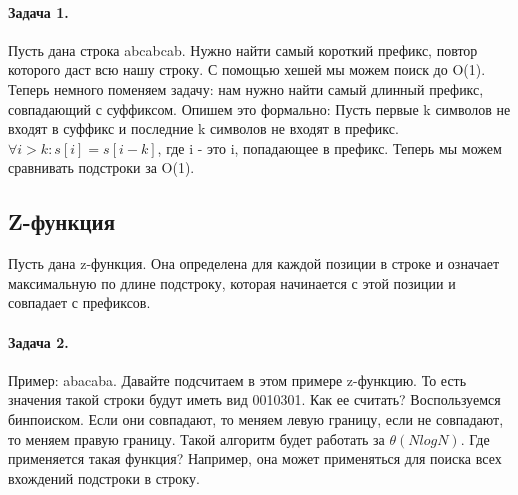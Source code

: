\documentclass[a4paper,12pt]{article}
\begin{document}
\paragraph{Задача 1.} Пусть дана строка abcabcab. Нужно найти самый короткий префикс, повтор которого даст всю нашу строку. С помощью хешей мы можем поиск до O(1). Теперь немного поменяем задачу: нам нужно найти самый длинный префикс, совпадающий с суффиксом. Опишем это формально: Пусть первые k символов не входят в суффикс и последние k символов не входят в префикс. \\
$\forall i > k: s[i] = s[i - k]$, где i - это i, попадающее в префикс. Теперь мы можем сравнивать подстроки за O(1). 
\subsection{Z-функция}
Пусть дана z-функция. Она определена для каждой позиции в строке и означает максимальную по длине подстроку, которая начинается с этой позиции и совпадает с префиксов.
\paragraph{Задача 2.} Пример: abacaba. Давайте подсчитаем в этом примере z-функцию. То есть значения такой строки будут иметь вид 0010301. Как ее считать? Воспользуемся бинпоиском. Если они совпадают, то меняем левую границу, если не совпадают, то меняем правую границу. Такой алгоритм будет работать за $\theta(NlogN)$. Где применяется такая функция? Например, она может применяться для поиска всех вхождений подстроки в строку. 
\end{document}
